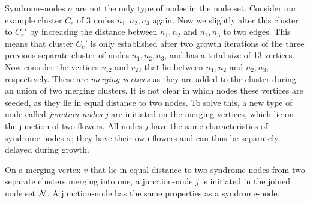 Syndrome-nodes $\sigma$ are not the only type of nodes in the node set. Consider our example cluster $C_e$ of 3 nodes $n_1, n_2, n_3$ again. Now we slightly alter this cluster to $C_e'$ by increasing the distance between $n_1, n_2$ and $n_2, n_3$ to two edges. This means that cluster $C_e'$ is only established after two growth iterations of the three previous separate cluster of nodes $n_1, n_2, n_3$, and has a total size of 13 vertices. Now consider the vertices $v_{12}$ and $v_{23}$ that lie between $n_1, n_2$ and $n_2, n_3$, respectively. These are \emph{merging vertices} as they are added to the cluster during an union of two merging clusters. It is not clear in which nodes these vertices are seeded, as they lie in equal distance to two nodes. To solve this, a new type of node called \emph{junction-nodes} $j$ are initiated on the merging vertices, which lie on the junction of two flowers. All nodes $j$ have the same characteristics of syndrome-nodes $\sigma$; they have their own flowers and can thus be separately delayed during growth.

\begin{lemma}\label{lem:junctionode}
  On a merging vertex $v$ that lie in equal distance to two syndrome-nodes from two separate clusters merging into one, a junction-node $j$ is initiated in the joined node set $\mathcal{N}$. A junction-node has the same properties as a syndrome-node.
\end{lemma}


